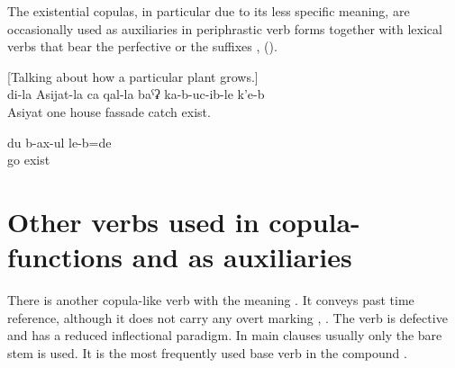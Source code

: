 The existential copulas, in particular  due to its less specific meaning, are occasionally used as auxiliaries in periphrastic verb forms together with lexical verbs that bear the perfective or the  suffixes ,  ().

\begin{exe}
	\ex	\label{ex:[Talking about how a particular plant grows.] ‎‎[It can become large], at my Asjiat's place it covered one wall of the house}
	[Talking about how a particular plant grows.]\\
	\gll	di-la	Asijat-la	ca	qal-la	baˁʡ	ka-b-uc-ib-le	k'e-b\\
			Asiyat	one	house	fassade	catch	exist.\\
	\glt	{}

	\ex	\label{ex:[at the time when the fox was born], I went run around (said the wolf)}
	\gll	du	b-ax-ul	le-b=de\\
			go	exist\\
	\glt	{}
\end{exe}



\section{Other verbs used in copula-functions and as auxiliaries}
\label{sec:Other verbs used in copula-functions and as auxiliaries}

There is another copula-like verb  with the meaning . It conveys past time reference, although it does not carry any overt marking , . The verb is defective and has a reduced inflectional paradigm. In main clauses usually only the bare stem is used. It is the most frequently used base verb in the compound  .

